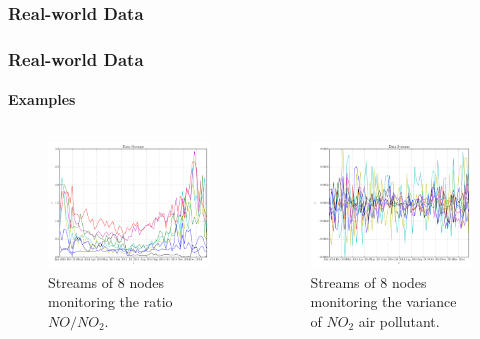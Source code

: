 \documentclass[hyperref={pdfpagelabels=false}]{beamer}
\begin{document}
\subsubsection*{Real-world Data}
\begin{frame} \frametitle{Real-world Data}\framesubtitle{Examples}
\begin{columns}
\begin{column}[t]{0.5\linewidth}
\begin{figure}
\centering
\includegraphics[scale=0.2]{../img/AT_NO2_NO_2014_8N_streams.pdf}
\caption{Streams of 8 nodes monitoring the ratio $NO/NO_2$.} 
\end{figure}
\end{column}
\begin{column}[t]{0.5\linewidth}
\begin{figure}
\centering
\includegraphics[scale=0.2]{../img/AT_NO2_sq_2014_8N_streams.pdf}
\caption{Streams of 8 nodes monitoring the variance of $NO_2$ air pollutant.} 
\end{figure}
\end{column}
\end{columns}
\end{frame}
\end{document}
